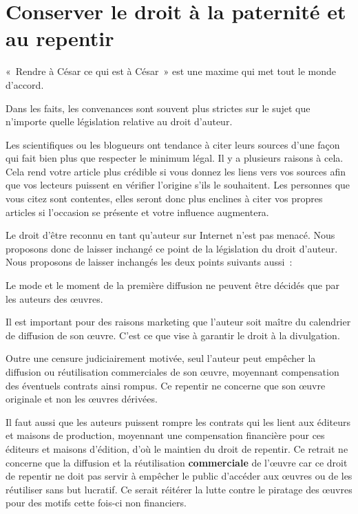 \chapter{Conserver le droit à la paternité et au repentir}\label{pater}

\begin{mesure}
 «~Rendre à César ce qui est à César~» est une maxime qui met tout le monde d’accord.
\end{mesure}

Dans les faits, les convenances sont souvent
plus strictes sur le sujet que n’importe quelle législation relative au droit d’auteur.

Les scientifiques ou les blogueurs ont tendance à citer leurs sources d’une façon qui fait bien plus que respecter le
minimum légal. Il y a plusieurs raisons à cela. Cela rend votre article plus crédible si vous donnez
les liens vers vos sources afin que vos lecteurs puissent en vérifier l’origine s'ils le
souhaitent. Les personnes que vous citez sont contentes, elles seront donc plus enclines à citer
vos propres articles si l’occasion se présente et votre influence augmentera. 

Le droit d’être reconnu en tant qu’auteur sur Internet n’est pas menacé. Nous proposons donc de
laisser inchangé ce point de la législation du droit d’auteur. Nous proposons de laisser inchangés les deux points suivants aussi~:

\begin{mesure}
Le mode et le moment de la première diffusion ne peuvent être décidés que par les auteurs des œuvres. 
\end{mesure}

Il est important pour des raisons marketing que l'auteur soit maître du calendrier de diffusion de son œuvre. C'est ce que vise à garantir le droit à la divulgation. 

\begin{mesure}
Outre une censure judiciairement motivée, seul l'auteur peut empêcher la diffusion ou réutilisation commerciales de son œuvre, moyennant compensation des éventuels contrats ainsi rompus. Ce repentir ne concerne que son œuvre originale et non les œuvres dérivées.
\end{mesure}

Il faut aussi que les auteurs puissent rompre les contrats qui les lient aux éditeurs et maisons de production, moyennant une compensation financière pour ces éditeurs et maisons d'édition, d'où le maintien du droit de repentir. Ce retrait ne concerne que la diffusion et la réutilisation \textbf{commerciale} de l'œuvre car ce droit de repentir ne doit pas servir à empêcher le public d'accéder aux œuvres ou de les réutiliser sans but lucratif. Ce serait réitérer la lutte contre le piratage des œuvres pour des motifs cette fois-ci non financiers. 

